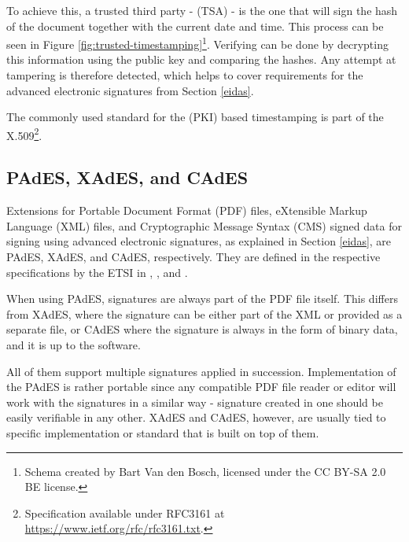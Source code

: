 \documentclass[thesismargins, english, thesislinespacing, onelinechapterstyle, upjsfrontpage]{rnthesis}
\begin{document}
To achieve this, a trusted third party -  (TSA) - is the one that will sign the hash of the document together with the current date and time.
This process can be seen in Figure \ref{fig:trusted-timestamping}\footnote{Schema created by Bart Van den Bosch, licensed under the CC BY-SA 2.0 BE license.}.
Verifying can be done by decrypting this information using the public key and comparing the hashes.
Any attempt at tampering is therefore detected, which helps to cover requirements for the advanced electronic signatures from Section \ref{eidas}.


The commonly used standard for the  (PKI) based timestamping is part of the X.509\footnote{Specification available under RFC3161 at \url{https://www.ietf.org/rfc/rfc3161.txt}.}.

\subsection{PAdES, XAdES, and CAdES} \label{etsi}

Extensions for Portable Document Format (PDF) files, eXtensible Markup Language (XML) files, and Cryptographic Message Syntax (CMS) signed data for signing using advanced electronic signatures, as explained in Section \ref{eidas}, are PAdES, XAdES, and CAdES, respectively.
They are defined in the respective specifications by the ETSI in \cite{pades}, \cite{xades}, and \cite{cades}.

When using PAdES, signatures are always part of the PDF file itself.
This differs from XAdES, where the signature can be either part of the XML or provided as a separate file, or CAdES where the signature is always in the form of binary data, and it is up to the software.

All of them support multiple signatures applied in succession.
Implementation of the PAdES is rather portable since any compatible PDF file reader or editor will work with the signatures in a similar way - signature created in one should be easily verifiable in any other. XAdES and CAdES, however, are usually tied to specific implementation or standard that is built on top of them.
\end{document}
